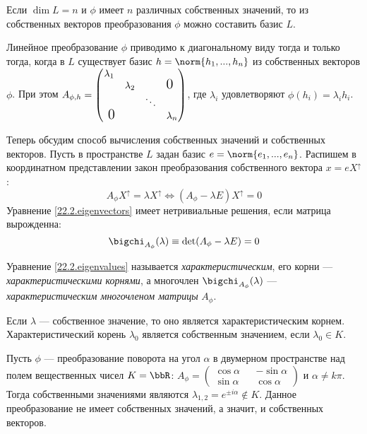   \begin{cons}
  Если $\dim L = n$ и $\phi$ имеет $n$ различных собственных значений, то из собственных векторов преобразования $\phi$ можно составить базис $L$.
  \end{cons}  
  \begin{stt}
  Линейное преобразование $\phi$ приводимо к диагональному виду тогда и только тогда, когда в $L$ существует базис $ h = \norm{h_1,...,h_n}$ из собственных векторов $\phi$. При этом $A_{\phi,h}=
  \begin{pmatrix}
  \lambda_1 &           &        & \\
            & \lambda_2 &        & \fudge {0 }  \\
            &			& \ddots & \\
  \fudge{ 0}&			&		 & \lambda_n \\
  \end{pmatrix}$, где $\lambda_i$ удовлетворяют $\phi(h_i)=\lambda_i h_i$.
  \end{stt} 
  
  Теперь обсудим способ вычисления собственных значений и собственных векторов. Пусть в пространстве $L$ задан базис $ e=\norm{e_1,...,e_n}$. Распишем в координатном представлении закон преобразования собственного вектора $x=e X^\uparrow$:
  \begin{equation}\label{22.2.eigenvectors}
    A_\phi X^\uparrow=\lambda X^\uparrow \Leftrightarrow (A_\phi-\lambda E)X^\uparrow=0
  \end{equation}
Уравнение \ref{22.2.eigenvectors} имеет нетривиальные решения, если матрица вырожденна:
  \begin{equation}\label{22.2.eigenvalues}
  \bigchi_{A_\phi}(\lambda)\equiv\det(A_\phi-\lambda E)=0
  \end{equation}
  \begin{defn}
    Уравнение \ref{22.2.eigenvalues} называется \textit{характеристическим}, его корни --- \textit{характеристическими корнями}, а многочлен $\bigchi_{A_\phi}(\lambda)$ --- \textit{характеристическим многочленом матрицы} $A_\phi$.
  \end{defn}
  \begin{stt}
  Если $\lambda$ --- собственное значение, то оно является характеристическим корнем. Характеристический корень $\lambda_0$ является собственным значением, если $\lambda_0 \in K$.
  \end{stt}
  \begin{exmpl}
  Пусть $\phi$ --- преобразование поворота на угол $\alpha$ в двумерном пространстве над полем вещественных чисел $K=\bbR$: $A_\phi=\begin{pmatrix}
  \cos\alpha && -\sin\alpha \\ \sin\alpha && \cos\alpha
  \end{pmatrix}$ и $\alpha \neq k\pi$. Тогда собственными значениями являются $\lambda_{1,2}=e^{\pm i\alpha} \notin K$. Данное преобразование не имеет собственных значений, а значит, и собственных векторов.
  \end{exmpl}

